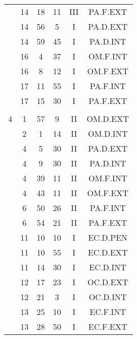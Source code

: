 \documentclass[12pt, a4paper]{article}
\begin{document}
\begin{multicols}{3}
{\begin{tabular}{c c c c c c}
	 	 	 	 & 14 & 18 & 11 & III & PA.F.EXT\\%
	 	 	 	 & 14 & 56 & 5 & I & PA.D.EXT\\%
	 	 	 	 & 14 & 59 & 45 & I & PA.D.INT\\%
	 	 	 	 & 16 & 4 & 37 & I & OM.F.INT\\%
	 	 	 	 & 16 & 8 & 12 & I & OM.F.EXT\\%
	 	 	 	 & 17 & 11 & 55 & I & PA.F.INT\\%
	 	 	 	 & 17 & 15 & 30 & I & PA.F.EXT\\%
	 	 	 	 & & & & & \\%
	 	 	 	4 & 1 & 57 & 9 & II & OM.D.EXT\\%
	 	 	 	 & 2 & 1 & 14 & II & OM.D.INT\\%
	 	 	 	 & 4 & 5 & 30 & II & PA.D.EXT\\%
	 	 	 	 & 4 & 9 & 30 & II & PA.D.INT\\%
	 	 	 	 & 4 & 39 & 11 & II & OM.F.INT\\%
	 	 	 	 & 4 & 43 & 11 & II & OM.F.EXT\\%
	 	 	 	 & 6 & 50 & 26 & II & PA.F.INT\\%
	 	 	 	 & 6 & 54 & 21 & II & PA.F.EXT\\%
	 	 	 	 & 11 & 10 & 10 & I & EC.D.PEN\\%
	 	 	 	 & 11 & 10 & 55 & I & EC.D.EXT\\%
	 	 	 	 & 11 & 14 & 30 & I & EC.D.INT\\%
	 	 	 	 & 12 & 17 & 23 & I & OC.D.EXT\\%
	 	 	 	 & 12 & 21 & 3 & I & OC.D.INT\\%
	 	 	 	 & 13 & 25 & 10 & I & EC.F.INT\\%
	 	 	 	 & 13 & 28 & 50 & I & EC.F.EXT\\%

\end{tabular}}
\end{multicols}
\end{document}
